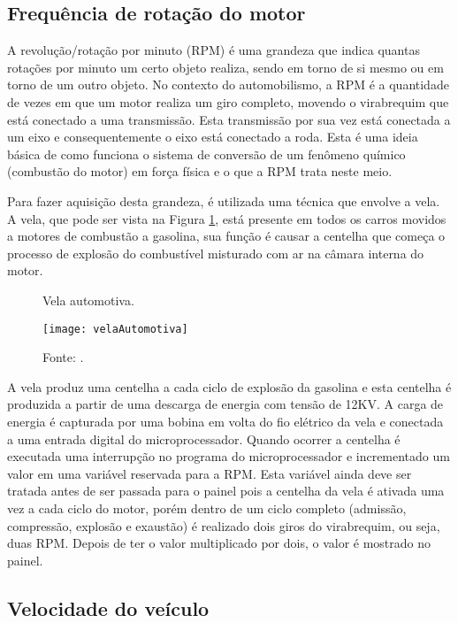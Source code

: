 \subsection{Frequência de rotação do motor}

A revolução/rotação por minuto (RPM) é uma grandeza que indica quantas rotações por minuto um certo objeto realiza, sendo em torno de si mesmo ou em torno de um outro objeto. No contexto do automobilismo, a RPM é a quantidade de vezes em que um motor realiza um giro completo, movendo o virabrequim que está conectado a uma transmissão. Esta transmissão por sua vez está conectada a um eixo e consequentemente o eixo está conectado a roda. Esta é uma ideia básica de como funciona o sistema de conversão de um fenômeno químico (combustão do motor) em força física e o que a RPM trata neste meio.

Para fazer aquisição desta grandeza, é utilizada uma técnica que envolve a vela. A vela, que pode ser vista na Figura \ref{fig:vela}, está presente em todos os carros movidos a motores de combustão a gasolina, sua função é causar a centelha que começa o processo de explosão do combustível misturado com ar na câmara interna do motor.       

\begin{figure}[!htb]
	\centering
		\caption{Vela automotiva.}
		\texttt{[image: velaAutomotiva]} 
		\caption*{Fonte: \cite{vela}.}
		\label{fig:vela}
\end{figure} 

A vela produz uma centelha a cada ciclo de explosão da gasolina e esta centelha é produzida a partir de uma descarga de energia com tensão de 12KV. A carga de energia é capturada por uma bobina em volta do fio elétrico da vela e conectada a uma entrada digital do microprocessador. Quando ocorrer a centelha é executada uma interrupção no programa do microprocessador e incrementado um valor em uma variável reservada para a RPM. Esta variável ainda deve ser tratada antes de ser passada para o painel pois a centelha da vela é ativada uma vez a cada ciclo do motor, porém dentro de um ciclo completo (admissão, compressão, explosão e exaustão) é realizado dois giros do virabrequim, ou seja, duas RPM. Depois de ter o valor multiplicado por dois, o valor é mostrado no painel. 

\subsection{Velocidade do veículo}

